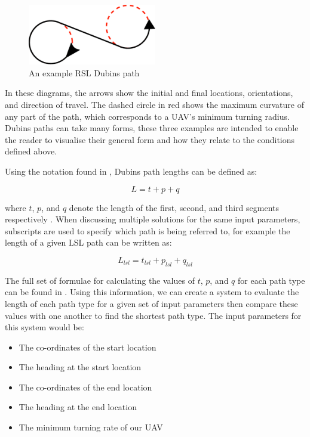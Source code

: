 \begin{figure}[htbp!] 
\centering    
\includegraphics[width=0.5\textwidth]{RSL}
\caption[Dubins RSL path]{An example RSL Dubins path}
\label{fig:rsl}
\end{figure}

In these diagrams, the arrows show the initial and final locations, orientations, and direction of travel. The dashed circle in red shows the maximum curvature of any part of the path, which corresponds to a UAV's minimum turning radius. Dubins paths can take many forms, these three examples are intended to enable the reader to visualise their general form and how they relate to the conditions defined above.

Using the notation found in \cite{shkel2001classification}, Dubins path lengths can be defined as:

\begin{equation}
	L = t + p + q
\end{equation}

where $t$, $p$, and $q$ denote the length of the first, second, and third segments respectively \cite{dubins1957curves}. When discussing multiple solutions for the same input parameters, subscripts are used to specify which path is being referred to, for example the length of a given LSL path can be written as:

\begin{equation}
	L_{lsl} = t_{lsl} + p_{lsl} + q_{lsl}
\end{equation}

The full set of formulae for calculating the values of $t$, $p$, and $q$ for each path type can be found in \cite{shkel2001classification}. Using this information, we can create a system to evaluate the length of each path type for a given set of input parameters then compare these values with one another to find the shortest path type. The input parameters for this system would be:

\begin{itemize}
	\item The co-ordinates of the start location
	\item The heading at the start location
	\item The co-ordinates of the end location
	\item The heading at the end location
	\item The minimum turning rate of our UAV
\end{itemize}

